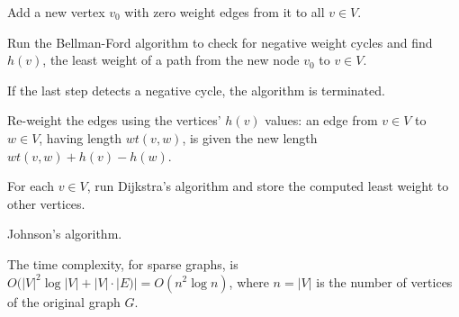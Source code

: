 %
%
%

\begin{algorithm}[!htpb]
\dontprintsemicolon  %
\BlankLine
Add a new vertex $v_0$ with zero weight edges from it to all $v \in V$.\;

Run the Bellman-Ford algorithm to check for negative weight cycles
and find $h(v)$, the least weight of a path from the new node $v_0$ to
$v \in V$.

If the last step detects a negative cycle, the algorithm is terminated.\;

Re-weight the edges using the vertices' $h(v)$ values: an edge from
$v \in V$ to $w \in V$, having length $wt(v,w)$, is given the new length
$wt(v,w) + h(v) - h(w)$.\;

For each $v \in V$, run Dijkstra's algorithm and store the computed
least weight to other vertices.
\caption{Johnson's algorithm.}
\label{alg:graph_algorithms:johnson}
\end{algorithm}

The time complexity, for sparse graphs, is
$O(|V|^2\log |V| + |V| \cdot |E)|=O(n^2\log n)$, where $n = |V|$ is
the number of vertices of the original graph $G$.
